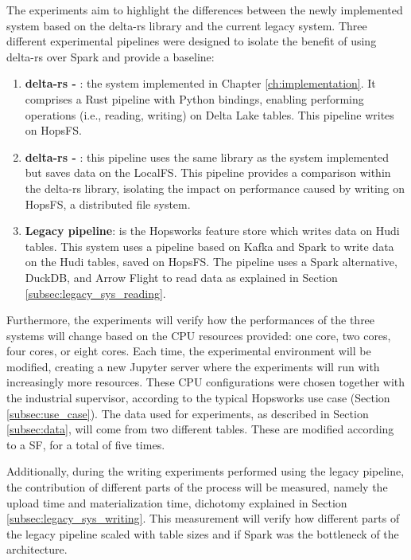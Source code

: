 The experiments aim to highlight the differences between the newly implemented system based on the delta-rs library and the current legacy system. Three different experimental pipelines were designed to isolate the benefit of using delta-rs over Spark and provide a baseline:
\begin{enumerate}
    \item \textbf{delta-rs - }: the system implemented in Chapter \ref{ch:implementation}. It comprises a Rust pipeline with Python bindings, enabling performing operations (i.e., reading, writing) on Delta Lake tables. This pipeline writes on \gls{HopsFS}.
    \item \textbf{delta-rs - }: this pipeline uses the same library as the system implemented but saves data on the \gls{LocalFS}. This pipeline provides a comparison within the delta-rs library, isolating the impact on performance caused by writing on \gls{HopsFS}, a distributed file system.
    \item \textbf{Legacy pipeline}: is the Hopsworks feature store which writes data on Hudi tables. This system uses a pipeline based on Kafka and Spark to write data on the Hudi tables, saved on \gls{HopsFS}. The pipeline uses a Spark alternative, DuckDB, and Arrow Flight to read data as explained in Section \ref{subsec:legacy_sys_reading}. 
\end{enumerate}

Furthermore, the experiments will verify how the performances of the three systems will change based on the \gls{CPU} resources provided: one core, two cores, four cores, or eight cores. Each time, the experimental environment will be modified, creating a new Jupyter server where the experiments will run with increasingly more resources. These \gls{CPU} configurations were chosen together with the industrial supervisor, according to the typical Hopsworks use case (Section \ref{subsec:use_case}). The data used for experiments, as described in Section \ref{subsec:data}, will come from two different tables. These are modified according to a \gls{SF}, for a total of five times. 

Additionally, during the writing experiments performed using the legacy pipeline, the contribution of different parts of the process will be measured, namely the upload time and materialization time, dichotomy explained in Section \ref{subsec:legacy_sys_writing}. This measurement will verify how different parts of the legacy pipeline scaled with table sizes and if Spark was the bottleneck of the architecture.

